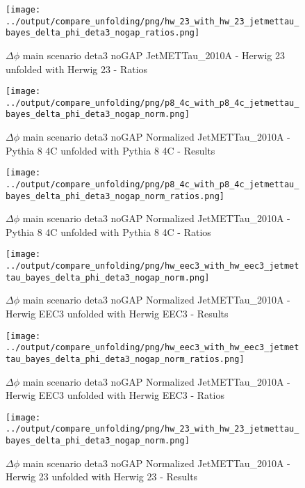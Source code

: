 \documentclass[11pt]{book}
\begin{document}
\begin{figure}[ht]
\centering
\texttt{[image: ../output/compare\_unfolding/png/hw\_23\_with\_hw\_23\_jetmettau\_bayes\_delta\_phi\_deta3\_nogap\_ratios.png]}
\caption{$\Delta\phi$ main scenario deta3 noGAP JetMETTau\_2010A - Herwig 23 unfolded with Herwig 23 - Ratios}
\label{hw_23_hw_23_jetmettau_bayes_delta_phi_deta3_nogap_b}
\end{figure}

\begin{figure}[ht]
\centering
\texttt{[image: ../output/compare\_unfolding/png/p8\_4c\_with\_p8\_4c\_jetmettau\_bayes\_delta\_phi\_deta3\_nogap\_norm.png]}
\caption{$\Delta\phi$ main scenario deta3 noGAP Normalized JetMETTau\_2010A - Pythia 8 4C unfolded with Pythia 8 4C - Results}
\label{p8_p8_jetmettau_bayes_delta_phi_deta3_nogap_norm_a}
\end{figure}

\begin{figure}[ht]
\centering
\texttt{[image: ../output/compare\_unfolding/png/p8\_4c\_with\_p8\_4c\_jetmettau\_bayes\_delta\_phi\_deta3\_nogap\_norm\_ratios.png]}
\caption{$\Delta\phi$ main scenario deta3 noGAP Normalized JetMETTau\_2010A - Pythia 8 4C unfolded with Pythia 8 4C - Ratios}
\label{p8_p8_jetmettau_bayes_delta_phi_deta3_nogap_norm_b}
\end{figure}

\begin{figure}[ht]
\centering
\texttt{[image: ../output/compare\_unfolding/png/hw\_eec3\_with\_hw\_eec3\_jetmettau\_bayes\_delta\_phi\_deta3\_nogap\_norm.png]}
\caption{$\Delta\phi$ main scenario deta3 noGAP Normalized JetMETTau\_2010A - Herwig EEC3 unfolded with Herwig EEC3 - Results}
\label{hw_eec3_hw_eec3_jetmettau_bayes_delta_phi_deta3_nogap_norm_a}
\end{figure}

\begin{figure}[ht]
\centering
\texttt{[image: ../output/compare\_unfolding/png/hw\_eec3\_with\_hw\_eec3\_jetmettau\_bayes\_delta\_phi\_deta3\_nogap\_norm\_ratios.png]}
\caption{$\Delta\phi$ main scenario deta3 noGAP Normalized JetMETTau\_2010A - Herwig EEC3 unfolded with Herwig EEC3 - Ratios}
\label{hw_eec3_hw_eec3_jetmettau_bayes_delta_phi_deta3_nogap_norm_b}
\end{figure}

\begin{figure}[ht]
\centering
\texttt{[image: ../output/compare\_unfolding/png/hw\_23\_with\_hw\_23\_jetmettau\_bayes\_delta\_phi\_deta3\_nogap\_norm.png]}
\caption{$\Delta\phi$ main scenario deta3 noGAP Normalized JetMETTau\_2010A - Herwig 23 unfolded with Herwig 23 - Results}
\label{hw_23_hw_23_jetmettau_bayes_delta_phi_deta3_nogap_norm_a}
\end{figure}
\end{document}
